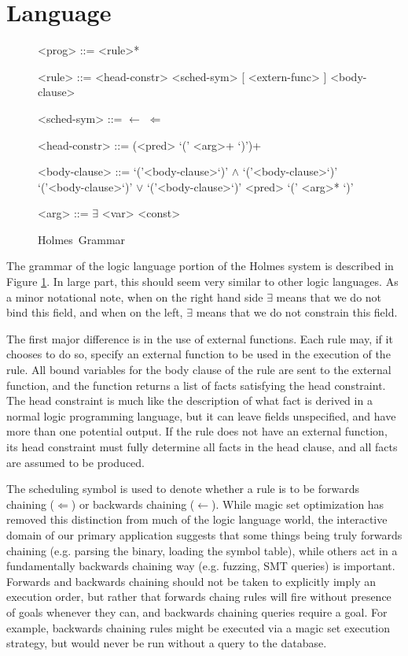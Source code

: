 \documentclass{article}
\newcommand{\sysname}{Holmes}
\begin{document}
\section{Language}
\begin{figure}
\begin{grammar}

<prog> ::= <rule>*

<rule> ::= <head-constr> <sched-sym> [ <extern-func> ] <body-clause>

<sched-sym> ::= $\leftarrow$
\alt $\Leftarrow$

<head-constr> ::= (<pred> `(' <arg>+ `)')+

<body-clause>
::=  `('<body-clause>`)' $\wedge$ `('<body-clause>`)'
\alt `('<body-clause>`)' $\vee$ `('<body-clause>`)'
\alt <pred> `(' <arg>* `)'

<arg> ::= $\exists$ \alt <var> \alt <const>
\end{grammar}
\label{fig:holmesGrammar}
\caption{\sysname\ Grammar}
\end{figure}
The grammar of the logic language portion of the Holmes system is described in  Figure \ref{fig:holmesGrammar}.
In large part, this should seem very similar to other logic languages.
As a minor notational note, when on the right hand side $\exists$ means that we do not bind this field, and when on the left, $\exists$ means that we do not constrain this field.

The first major difference is in the use of external functions.
Each rule may, if it chooses to do so, specify an external function to be used in the execution of the rule.
All bound variables for the body clause of the rule are sent to the external function, and the function returns a list of facts satisfying the head constraint.
The head constraint is much like the description of what fact is derived in a normal logic programming language, but it can leave fields unspecified, and have more than one potential output.
If the rule does not have an external function, its head constraint must fully determine all facts in the head clause, and all facts are assumed to be produced.

The scheduling symbol is used to denote whether a rule is to be forwards chaining ($\Leftarrow$) or backwards chaining ($\leftarrow$).
While magic set optimization has removed this distinction from much of the logic language world, the interactive domain of our primary application suggests that some things being truly forwards chaining (e.g. parsing the binary, loading the symbol table), while others act in a fundamentally backwards chaining way (e.g. fuzzing, SMT queries) is important.
Forwards and backwards chaining should not be taken to explicitly imply an execution order, but rather that forwards chaing rules will fire without presence of goals whenever they can, and backwards chaining queries require a goal.
For example, backwards chaining rules might be executed via a magic set execution strategy, but would never be run without a query to the database.
\end{document}
